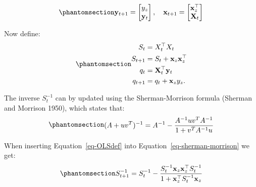 \documentclass[
  letterpaper,
  DIV=11,
  numbers=noendperiod]{scrreprt}
\begin{document}
\begin{equation}\protect\phantomsection\label{eq-gen-0098}{  
\begin{align}
    \mathbf{y}_{t+1} = \begin{bmatrix} y_{z} \\ \mathbf{y}_t  \end{bmatrix}, \quad
    \mathbf{x}_{t+1} = \begin{bmatrix} \mathbf{x}^{\top}_{z} \\ \mathbf{X}_t  \end{bmatrix}
\end{align}
}\end{equation}

Now define: \begin{equation}\protect\phantomsection\label{eq-OLSdef}{  
\begin{align}
    S_t     &= X_t^{\top} X_t \\
    S_{t+1} &= S_t + \mathbf{x}_{z} \mathbf{x}^{\top}_{z} \\
    q_t     &= \mathbf{X}_t^{\top} \mathbf{y}_t \\
    q_{t+1} &= q_t + \mathbf{x}_{z} y_{z}.
\end{align}
}\end{equation}

The inverse \(S_t^{-1}\) can by updated using the Sherman-Morrison
formula (Sherman and Morrison 1950), which states that:
\begin{equation}\protect\phantomsection\label{eq-sherman-morrison}{  
\begin{align}
    (A + uv^T)^{-1} = A^{-1} - \frac{A^{-1} u v^T A^{-1}}{1 + v^T A^{-1} u}
\end{align}
}\end{equation}

When inserting Equation~\ref{eq-OLSdef} into
Equation~\ref{eq-sherman-morrison} we get:
\begin{equation}\protect\phantomsection\label{eq-gen-0101}{  
\begin{align}
    S_{t+1}^{-1} = S_t^{-1} - \frac{S_t^{-1} \mathbf{x}_z \mathbf{x}_z^{\top} S_t^{-1}}{1 + \mathbf{x}_z^{\top} S_t^{-1} \mathbf{x}_z}
\end{align}
}\end{equation}
\end{document}
